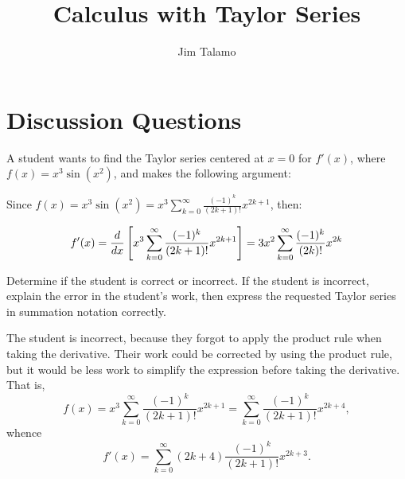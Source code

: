\documentclass[noauthor]{ximera}
\author{Jim Talamo}
\title{Calculus with Taylor Series}
\begin{document}
\begin{abstract}
\end{abstract}
\maketitle

\vspace{-0.9in}

\section{Discussion Questions}

\begin{problem} 

A student wants to find the Taylor series centered at $x=0$ for $f'(x)$, where $f(x) = x^3 \sin(x^2)$, and makes the following argument:

Since $f(x) = x^3 \sin(x^2) = x^3 \sum_{k=0}^{\infty} \frac{(-1)^k}{(2k+1)!}x^{2k+1}$, then:

\begin{align*}
f'(x) = \frac{d}{\mathop{}\!d x} \left[  x^3 \sum_{k=0}^{\infty} \frac{(-1)^k}{(2k+1)!}x^{2k+1} \right] &=  3x^2 \sum_{k=0}^{\infty} \frac{(-1)^k}{(2k)!}x^{2k} \\ 
\end{align*}

Determine if the student is correct or incorrect.  If the student is incorrect, explain the error in the student's work, then express the requested Taylor series in summation notation correctly.

\begin{freeResponse}
The student is incorrect, because they forgot to apply the product rule when taking the derivative. Their work could be corrected by using the product rule, but it would be less work to simplify the expression before taking the derivative. That is,
$$
f(x) = x^3 \sum_{k=0}^{\infty} \frac{(-1)^k}{(2k+1)!}x^{2k+1} = \sum_{k=0}^\infty \frac{(-1)^k}{(2k+1)!}x^{2k+4},
$$
whence
$$
f'(x) = \sum_{k=0}^\infty (2k+4)\frac{(-1)^k}{(2k+1)!}x^{2k+3}.
$$
\end{freeResponse}
\end{problem}
\end{document}
